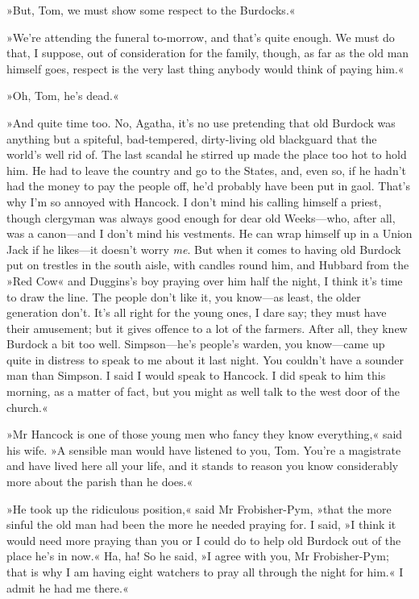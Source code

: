 »But, Tom, we must show some respect to the Burdocks.«

»We're attending the funeral to-morrow, and that's quite enough. We must do that, I suppose, out of consideration for the family, though, as far as the old man himself goes, respect is the very last thing anybody would think of paying him.«

»Oh, Tom, he's dead.«

»And quite time too. No, Agatha, it's no use pretending that old Burdock was anything but a spiteful, bad-tempered, dirty-living old blackguard that the world's well rid of. The last scandal he stirred up made the place too hot to hold him. He had to leave the country and go to the States, and, even so, if he hadn't had the money to pay the people off, he'd probably have been put in gaol. That's why I'm so annoyed with Hancock. I don't mind his calling himself a priest, though clergyman was always good enough for dear old Weeks—who, after all, was a canon—and I don't mind his vestments. He can wrap himself up in a Union Jack if he likes—it doesn't worry \textit{me}. But when it comes to having old Burdock put on trestles in the south aisle, with candles round him, and Hubbard from the »Red Cow« and Duggins's boy praying over him half the night, I think it's time to draw the line. The people don't like it, you know—as least, the older generation don't. It's all right for the young ones, I dare say; they must have their amusement; but it gives offence to a lot of the farmers. After all, they knew Burdock a bit too well. Simpson—he's people's warden, you know—came up quite in distress to speak to me about it last night. You couldn't have a sounder man than Simpson. I said I would speak to Hancock. I did speak to him this morning, as a matter of fact, but you might as well talk to the west door of the church.«

»Mr Hancock is one of those young men who fancy they know everything,« said his wife. »A sensible man would have listened to you, Tom. You're a magistrate and have lived here all your life, and it stands to reason you know considerably more about the parish than he does.«

»He took up the ridiculous position,« said Mr Frobisher-Pym, »that the more sinful the old man had been the more he needed praying for. I said, »I think it would need more praying than you or I could do to help old Burdock out of the place he's in now.« Ha, ha! So he said, »I agree with you, Mr Frobisher-Pym; that is why I am having eight watchers to pray all through the night for him.« I admit he had me there.«

